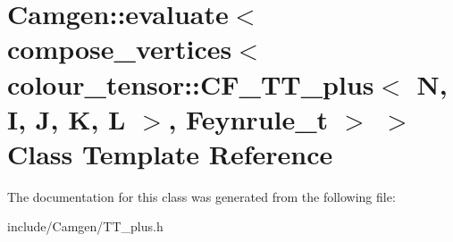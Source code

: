 \hypertarget{a00165}{}\section{Camgen\+:\+:evaluate$<$ compose\+\_\+vertices$<$ colour\+\_\+tensor\+:\+:C\+F\+\_\+\+T\+T\+\_\+plus$<$ N, I, J, K, L $>$, Feynrule\+\_\+t $>$ $>$ Class Template Reference}
\label{a00165}


The documentation for this class was generated from the following file\+:\begin{DoxyCompactItemize}
\item 
include/\+Camgen/T\+T\+\_\+plus.\+h\end{DoxyCompactItemize}
